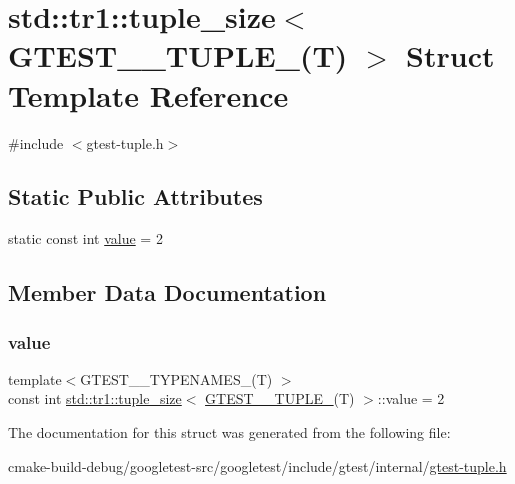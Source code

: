 \hypertarget{structstd_1_1tr1_1_1tuple__size_3_01GTEST__2__TUPLE___07T_08_01_4}{}\section{std\+::tr1\+::tuple\+\_\+size$<$ G\+T\+E\+S\+T\+\_\+\_\+\+T\+U\+P\+L\+E\+\_\+(T) $>$ Struct Template Reference}
\label{structstd_1_1tr1_1_1tuple__size_3_01GTEST__2__TUPLE___07T_08_01_4}


{\ttfamily \#include $<$gtest-\/tuple.\+h$>$}

\subsection*{Static Public Attributes}
\begin{DoxyCompactItemize}
\item 
static const int \mbox{\hyperlink{structstd_1_1tr1_1_1tuple__size_3_01GTEST__2__TUPLE___07T_08_01_4_a18545d733fa1f811712aa1153d8ba5d9}{value}} = 2
\end{DoxyCompactItemize}


\subsection{Member Data Documentation}
\mbox{\label{structstd_1_1tr1_1_1tuple__size_3_01GTEST__2__TUPLE___07T_08_01_4_a18545d733fa1f811712aa1153d8ba5d9}} 
\subsubsection{\texorpdfstring{value}{value}}
{\footnotesize\ttfamily template$<$G\+T\+E\+S\+T\+\_\+\_\+\+T\+Y\+P\+E\+N\+A\+M\+E\+S\+\_\+(\+T) $>$ \\
const int \mbox{\hyperlink{structstd_1_1tr1_1_1tuple__size}{std\+::tr1\+::tuple\+\_\+size}}$<$ \mbox{\hyperlink{namespacestd_1_1tr1_a05651180c3a4c06fe0f3b09144b82b93}{G\+T\+E\+S\+T\+\_\+\_\+\+T\+U\+P\+L\+E\+\_\+}}(T) $>$\+::value = 2\hspace{0.3cm}{\ttfamily [static]}}



The documentation for this struct was generated from the following file\+:\begin{DoxyCompactItemize}
\item 
cmake-\/build-\/debug/googletest-\/src/googletest/include/gtest/internal/\mbox{\hyperlink{gtest-tuple_8h}{gtest-\/tuple.\+h}}\end{DoxyCompactItemize}
